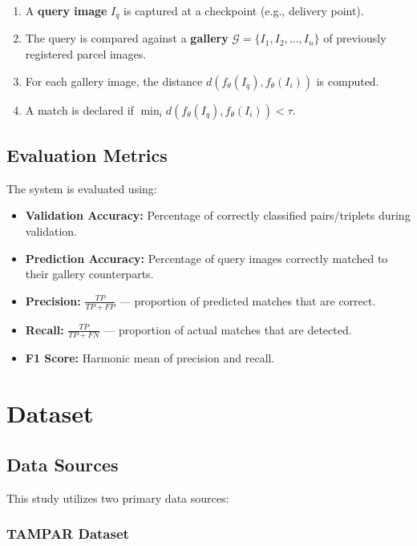 \documentclass[12pt,a4paper]{article}
\begin{document}
\begin{enumerate}
    \item A \textbf{query image} $I_q$ is captured at a checkpoint (e.g., delivery point).
    \item The query is compared against a \textbf{gallery} $\mathcal{G} = \{I_1, I_2, \ldots, I_n\}$ of previously registered parcel images.
    \item For each gallery image, the distance $d(f_\theta(I_q), f_\theta(I_i))$ is computed.
    \item A match is declared if $\min_i d(f_\theta(I_q), f_\theta(I_i)) < \tau$.
\end{enumerate}

\subsection{Evaluation Metrics}

The system is evaluated using:

\begin{itemize}
    \item \textbf{Validation Accuracy:} Percentage of correctly classified pairs/triplets during validation.
    \item \textbf{Prediction Accuracy:} Percentage of query images correctly matched to their gallery counterparts.
    \item \textbf{Precision:} $\frac{TP}{TP + FP}$ — proportion of predicted matches that are correct.
    \item \textbf{Recall:} $\frac{TP}{TP + FN}$ — proportion of actual matches that are detected.
    \item \textbf{F1 Score:} Harmonic mean of precision and recall.
\end{itemize}

\section{Dataset}
\label{sec:dataset}

\subsection{Data Sources}

This study utilizes two primary data sources:

\subsubsection{TAMPAR Dataset}
\end{document}
